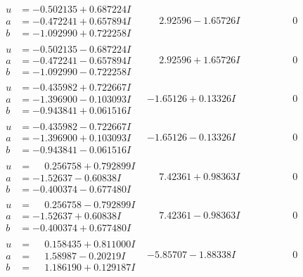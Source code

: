 \documentclass[1p]{elsarticle_modified}
\theoremstyle{definition}
\begin{document}
$$\begin{array}{c|c|c}
\begin{aligned}
u &= -0.502135 + 0.687224 I \\
a &= -0.472241 + 0.657894 I \\
b &= -1.092990 + 0.722258 I\end{aligned}
 & \phantom{-}2.92596 - 1.65726 I & \phantom{-0.000000 } 0 \\ \hline\begin{aligned}
u &= -0.502135 - 0.687224 I \\
a &= -0.472241 - 0.657894 I \\
b &= -1.092990 - 0.722258 I\end{aligned}
 & \phantom{-}2.92596 + 1.65726 I & \phantom{-0.000000 } 0 \\ \hline\begin{aligned}
u &= -0.435982 + 0.722667 I \\
a &= -1.396900 - 0.103093 I \\
b &= -0.943841 + 0.061516 I\end{aligned}
 & -1.65126 + 0.13326 I & \phantom{-0.000000 } 0 \\ \hline\begin{aligned}
u &= -0.435982 - 0.722667 I \\
a &= -1.396900 + 0.103093 I \\
b &= -0.943841 - 0.061516 I\end{aligned}
 & -1.65126 - 0.13326 I & \phantom{-0.000000 } 0 \\ \hline\begin{aligned}
u &= \phantom{-}0.256758 + 0.792899 I \\
a &= -1.52637 - 0.60838 I \\
b &= -0.400374 - 0.677480 I\end{aligned}
 & \phantom{-}7.42361 + 0.98363 I & \phantom{-0.000000 } 0 \\ \hline\begin{aligned}
u &= \phantom{-}0.256758 - 0.792899 I \\
a &= -1.52637 + 0.60838 I \\
b &= -0.400374 + 0.677480 I\end{aligned}
 & \phantom{-}7.42361 - 0.98363 I & \phantom{-0.000000 } 0 \\ \hline\begin{aligned}
u &= \phantom{-}0.158435 + 0.811000 I \\
a &= \phantom{-}1.58987 - 0.20219 I \\
b &= \phantom{-}1.186190 + 0.129187 I\end{aligned}
 & -5.85707 - 1.88338 I & \phantom{-0.000000 } 0\\

\end{array}$$
\end{document}
